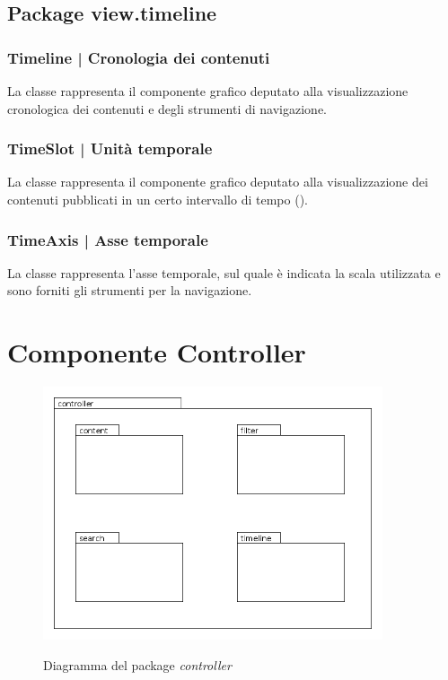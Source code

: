 \documentclass[10pt,a4paper,headinclude,footinclude,hidelinks]{scrreprt} %
\begin{document}
	\section{Package view.timeline}
	\label{sec:stage:design:sistema:view.timeline}

	\subsection[Timeline]{Timeline | Cronologia dei contenuti}
	\label{sec:stage:design:sistema:view.timeline:timeline-view}
	La classe \textit{} rappresenta il componente grafico deputato alla visualizzazione cronologica dei contenuti e degli strumenti di navigazione.

	\subsection[TimeSlot]{TimeSlot | Unità temporale}
	\label{sec:stage:design:sistema:view.timeline:time-slot}
	La classe \textit{} rappresenta il componente grafico deputato alla visualizzazione dei contenuti pubblicati in un certo intervallo di tempo (\textit{}).

	\subsection[TimeAxis]{TimeAxis | Asse temporale}
	\label{sec:stage:design:sistema:view.timeline:time-axis}
	La classe \textit{} rappresenta l'asse temporale, sul quale è indicata la scala utilizzata e sono forniti gli strumenti per la navigazione. 

	\chapter{Componente Controller}
	\label{ch:stage:design:controller}

	\begin{figure}[ht]
		\begin{center}
	    	\includegraphics[width=10cm]{package/controller.png}
			\label{gfx:package:controller}
			\caption{Diagramma del package \textit{controller}}
		\end{center}
	\end{figure}
\end{document}
